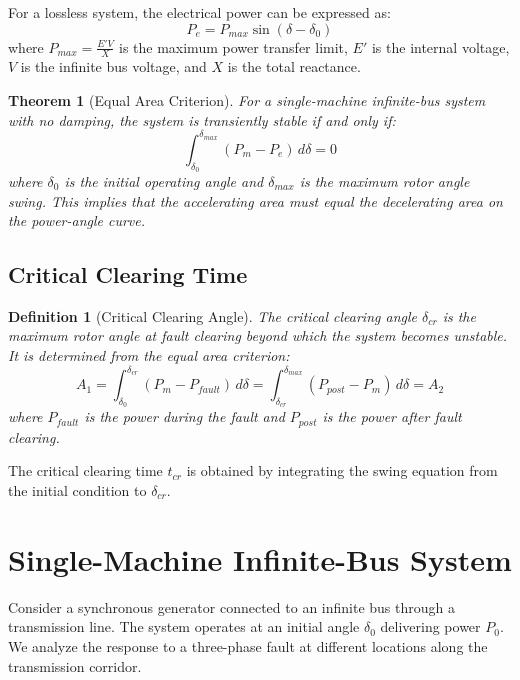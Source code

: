 \documentclass[11pt,a4paper]{article}
\newtheorem{definition}{Definition}[section]
\newtheorem{theorem}{Theorem}[section]
\begin{document}
For a lossless system, the electrical power can be expressed as:
\begin{equation}
P_e = P_{max} \sin(\delta - \delta_0)
\end{equation}
where $P_{max} = \frac{E'V}{X}$ is the maximum power transfer limit, $E'$ is the internal voltage, $V$ is the infinite bus voltage, and $X$ is the total reactance.

\begin{theorem}[Equal Area Criterion]
For a single-machine infinite-bus system with no damping, the system is transiently stable if and only if:
\begin{equation}
\int_{\delta_0}^{\delta_{max}} (P_m - P_e) \, d\delta = 0
\end{equation}
where $\delta_0$ is the initial operating angle and $\delta_{max}$ is the maximum rotor angle swing. This implies that the accelerating area must equal the decelerating area on the power-angle curve.
\end{theorem}

\subsection{Critical Clearing Time}

\begin{definition}[Critical Clearing Angle]
The critical clearing angle $\delta_{cr}$ is the maximum rotor angle at fault clearing beyond which the system becomes unstable. It is determined from the equal area criterion:
\begin{equation}
A_1 = \int_{\delta_0}^{\delta_{cr}} (P_m - P_{fault}) \, d\delta = \int_{\delta_{cr}}^{\delta_{max}} (P_{post} - P_m) \, d\delta = A_2
\end{equation}
where $P_{fault}$ is the power during the fault and $P_{post}$ is the power after fault clearing.
\end{definition}

The critical clearing time $t_{cr}$ is obtained by integrating the swing equation from the initial condition to $\delta_{cr}$.

\section{Single-Machine Infinite-Bus System}

Consider a synchronous generator connected to an infinite bus through a transmission line. The system operates at an initial angle $\delta_0$ delivering power $P_0$. We analyze the response to a three-phase fault at different locations along the transmission corridor.
\end{document}
